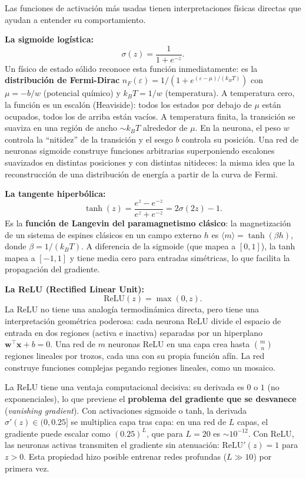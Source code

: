 Las funciones de activación más usadas tienen interpretaciones físicas
directas que ayudan a entender su comportamiento.

\textbf{La sigmoide logística:}
\begin{equation}
  \sigma(z) = \frac{1}{1+e^{-z}}.
  \label{eq:sigmoide}
\end{equation}
Un físico de estado sólido reconoce esta función inmediatamente: es la
\textbf{distribución de Fermi-Dirac} $n_F(\varepsilon) = 1/(1 +
e^{(\varepsilon-\mu)/(k_BT)})$ con $\mu = -b/w$ (potencial químico) y
$k_BT = 1/w$ (temperatura). A temperatura cero, la función es un escalón
(Heaviside): todos los estados por debajo de $\mu$ están ocupados, todos
los de arriba están vacíos. A temperatura finita, la transición se suaviza
en una región de ancho $\sim k_BT$ alrededor de $\mu$. En la neurona, el
peso $w$ controla la ``nitidez'' de la transición y el sesgo $b$ controla
su posición. Una red de neuronas sigmoide construye funciones arbitrarias
superponiendo escalones suavizados en distintas posiciones y con distintas
nitideces: la misma idea que la reconstrucción de una distribución de
energía a partir de la curva de Fermi.

\textbf{La tangente hiperbólica:}
\begin{equation}
  \tanh(z) = \frac{e^z - e^{-z}}{e^z + e^{-z}} = 2\sigma(2z) - 1.
  \label{eq:tanh}
\end{equation}
Es la \textbf{función de Langevin del paramagnetismo clásico}: la
magnetización de un sistema de espines clásicos en un campo externo $h$
es $\langle m \rangle = \tanh(\beta h)$, donde $\beta = 1/(k_BT)$. A
diferencia de la sigmoide (que mapea a $[0,1]$), la tanh mapea a
$[-1,1]$ y tiene media cero para entradas simétricas, lo que facilita
la propagación del gradiente.

\textbf{La ReLU (Rectified Linear Unit):}
\begin{equation}
  \text{ReLU}(z) = \max(0, z).
  \label{eq:relu}
\end{equation}
La ReLU no tiene una analogía termodinámica directa, pero tiene una
interpretación geométrica poderosa: cada neurona ReLU divide el
espacio de entrada en dos regiones (activa e inactiva) separadas por
un hiperplano $\bm{w}^\top\bm{x}+b = 0$. Una red de $m$ neuronas
ReLU en una capa crea hasta $\binom{m}{n}$ regiones lineales por
trozos, cada una con su propia función afín. La red construye
funciones complejas pegando regiones lineales, como un mosaico.

La ReLU tiene una ventaja computacional decisiva: su derivada es $0$ o
$1$ (no exponenciales), lo que previene el \textbf{problema del
gradiente que se desvanece} (\textit{vanishing gradient}). Con
activaciones sigmoide o tanh, la derivada $\sigma'(z) \in (0, 0.25]$
se multiplica capa tras capa: en una red de $L$ capas, el gradiente
puede escalar como $(0.25)^L$, que para $L = 20$ es $\sim 10^{-12}$.
Con ReLU, las neuronas activas transmiten el gradiente sin atenuación:
$\text{ReLU}'(z) = 1$ para $z > 0$. Esta propiedad hizo posible
entrenar redes profundas ($L \gg 10$) por primera vez.

